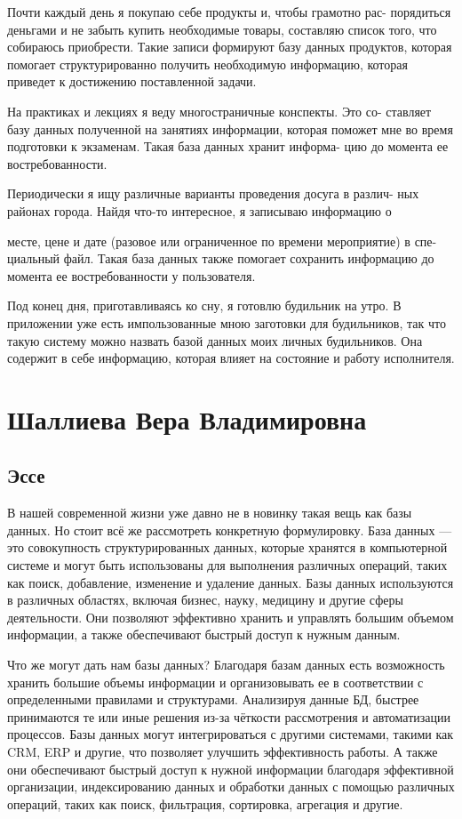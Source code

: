 \documentclass[14pt]{extreport}
\begin{document}
Почти каждый день я покупаю себе продукты и, чтобы грамотно рас-
порядиться деньгами и не забыть купить необходимые товары, составляю список того, что собираюсь приобрести. Такие записи формируют базу данных продуктов, которая помогает структурированно получить необходимую информацию, которая приведет к достижению поставленной задачи.

На практиках и лекциях я веду многостраничные конспекты. Это со-
ставляет базу данных полученной на занятиях информации, которая поможет мне во время подготовки к экзаменам. Такая база данных хранит информа-
цию до момента ее востребованности.

Периодически я ищу различные варианты проведения досуга в различ-
ных районах города. Найдя что-то интересное, я записываю информацию о

месте, цене и дате (разовое или ограниченное по времени мероприятие) в спе-
циальный файл. Такая база данных также помогает сохранить информацию до момента ее востребованности у пользователя.

Под конец дня, приготавливаясь ко сну, я готовлю будильник на утро. В
приложении уже есть импользованные мною заготовки для будильников, так
что такую систему можно назвать базой данных моих личных будильников.
Она содержит в себе информацию, которая влияет на состояние и работу
исполнителя.

\section{Шаллиева Вера Владимировна}

\subsection{Эссе}

В нашей современной жизни уже давно не в новинку такая вещь как базы данных. Но стоит всё же рассмотреть конкретную формулировку. База
данных — это совокупность структурированных данных, которые хранятся в
компьютерной системе и могут быть использованы для выполнения различных операций, таких как поиск, добавление, изменение и удаление данных.
Базы данных используются в различных областях, включая бизнес, науку,
медицину и другие сферы деятельности. Они позволяют эффективно хранить
и управлять большим объемом информации, а также обеспечивают быстрый
доступ к нужным данным.

Что же могут дать нам базы данных? Благодаря базам данных есть возможность хранить большие объемы информации и организовывать ее в соответствии с определенными правилами и структурами. Анализируя данные БД, быстрее принимаются те или иные решения из-за чёткости рассмотрения
и автоматизации процессов. Базы данных могут интегрироваться с другими
системами, такими как CRM, ERP и другие, что позволяет улучшить эффективность работы. А также они обеспечивают быстрый доступ к нужной
информации благодаря эффективной организации, индексированию данных
и обработки данных с помощью различных операций, таких как поиск, фильтрация, сортировка, агрегация и другие.
\end{document}
